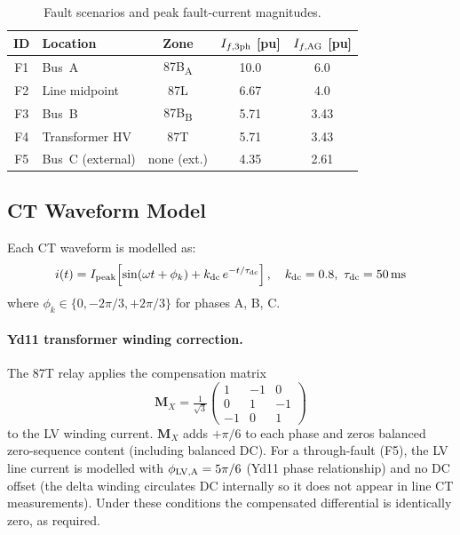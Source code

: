 \documentclass[12pt,a4paper]{article}
\newcommand{\vect}[1]{\boldsymbol{#1}}
\begin{document}
\begin{table}[H]
  \centering
  \caption{Fault scenarios and peak fault-current magnitudes.}
  \label{tab:fault_scenarios}
  \begin{tabular}{clccc}
    \toprule
    ID & Location & Zone & $I_{f,\rm 3ph}$ [pu] & $I_{f,\rm AG}$ [pu] \\
    \midrule
    F1 & Bus~A           & 87B\textsubscript{A} & 10.0 & 6.0 \\
    F2 & Line midpoint   & 87L                  & 6.67 & 4.0 \\
    F3 & Bus~B           & 87B\textsubscript{B} & 5.71 & 3.43 \\
    F4 & Transformer HV  & 87T                  & 5.71 & 3.43 \\
    F5 & Bus~C (external) & none (ext.)          & 4.35 & 2.61 \\
    \bottomrule
  \end{tabular}
\end{table}

\subsection{CT Waveform Model}

Each CT waveform is modelled as:
\begin{equation}
  i(t) = I_{\rm peak}\!\left[\sin(\omega t + \phi_k)
          + k_{\rm dc}\,e^{-t/\tau_{\rm dc}}\right], \quad
  k_{\rm dc} = 0.8,\ \tau_{\rm dc} = 50\,\text{ms}
  \label{eq:ct_wave}
\end{equation}
where $\phi_k \in \{0, -2\pi/3, +2\pi/3\}$ for phases A, B, C.

\paragraph{Yd11 transformer winding correction.}
The 87T relay applies the compensation matrix
\begin{equation}
  \vect{M}_X = \tfrac{1}{\sqrt{3}}
  \begin{pmatrix}1&-1&0\\0&1&-1\\-1&0&1\end{pmatrix}
  \label{eq:MX}
\end{equation}
to the LV winding current.  $\vect{M}_X$ adds $+\pi/6$ to each
phase and zeros balanced zero-sequence content (including balanced DC).
For a through-fault (F5), the LV line current is modelled with
$\phi_{\rm LV,A} = 5\pi/6$ (Yd11 phase relationship) and no DC offset
(the delta winding circulates DC internally so it does not appear in line
CT measurements).  Under these conditions the compensated differential is
identically zero, as required.
\end{document}
